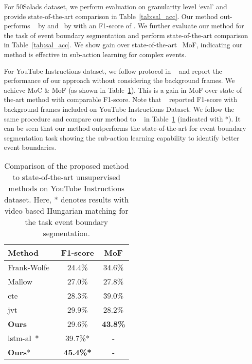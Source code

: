 \documentclass[final]{cvpr}
\begin{document}
\par For 50Salads dataset, we perform evaluation on granularity level `eval' and provide state-of-the-art comparison in Table~\ref{tab:sal_acc}. Our method out-performs ~\cite{kukleva2019unsupervised} by  and~\cite{vidalmata2020joint} by  with an F1-score of . We further evaluate our method for the task of event boundary segmentation and perform state-of-the-art comparison in Table~\ref{tab:sal_acc}. We show  gain over state-of-the-art~\cite{aakur2019perceptual} MoF, indicating our method is effective in sub-action learning for complex events. 

\par For YouTube Instructions dataset, we follow protocol in ~\cite{Alayrac16unsupervised, sener2018unsupervised, kukleva2019unsupervised} and report the performance of our approach without considering the background frames.
We achieve  MoC \&  MoF (as shown in Table~\ref{tab:acc_y}). 
This is a  gain in MoF over state-of-the-art method with comparable F1-score. 
Note that ~\cite{aakur2019perceptual} reported F1-score with background frames included on YouTube Instructions Dataset. We follow the same procedure and compare our method to ~\cite{aakur2019perceptual} in Table~\ref{tab:acc_y} (indicated with *). It can be seen that our method outperforms the state-of-the-art for event boundary segmentation task showing the sub-action learning capability to identify better event boundaries.

\begin{table}[t]
  \caption{ {\small  Comparison of the proposed method to state-of-the-art unsupervised methods on YouTube Instructions dataset. Here, * denotes results with video-based Hungarian matching for the task event boundary segmentation. 
  } }
  \label{tab:acc_y}
  \centering
  \small
  \begin{tabular}{lcc}
    \toprule
    {\bf Method} & {\bf F1-score} & {\bf MoF}\\
    \midrule
    Frank-Wolfe~\cite{Alayrac16unsupervised} & 24.4\%  & 34.6\%   \\
   Mallow~\cite{sener2018unsupervised} & 27.0\%  & 27.8\%   \\
    {\sc cte}~\cite{kukleva2019unsupervised}    & 28.3\% & 39.0\%      \\
    {\sc jvt}~\cite{vidalmata2020joint} & 29.9\% & 28.2\% \\
    \midrule
    {\bf Ours} & 29.6\% &  \textbf{43.8\%}  \\
    \midrule
    \midrule
    {\sc lstm-al}~\cite{aakur2019perceptual}* & 39.7\%* & - \\
    {\bf Ours}* & \textbf{45.4\%*} & - \\
    \bottomrule
  \end{tabular}
\end{table}
\end{document}
